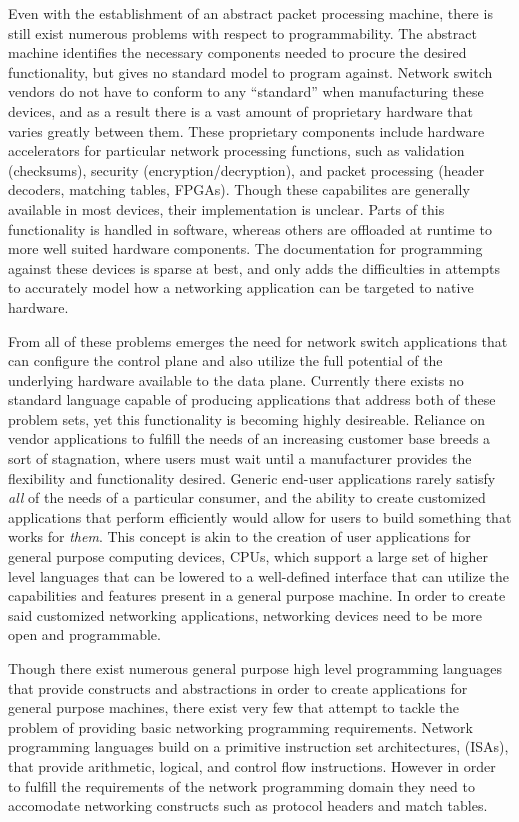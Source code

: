 Even with the establishment of an abstract packet processing machine, there
is still exist numerous problems with respect to programmability. The abstract 
machine identifies the necessary components needed to procure the desired 
functionality, but gives no standard model to program against. Network switch
vendors do not have to conform to any ``standard'' when manufacturing these
devices, and as a result there is a vast amount of proprietary hardware that
varies greatly between them. These proprietary components include hardware 
accelerators for particular network processing functions, such as validation 
(checksums), security (encryption/decryption), and packet processing (header
decoders, matching tables, FPGAs). Though these capabilites are generally 
available in most devices, their implementation is unclear. Parts of this 
functionality is handled in software, whereas others are offloaded at runtime 
to more well suited hardware components. The documentation for programming 
against these devices is sparse at best, and only adds the difficulties in 
attempts to accurately model how a networking application can be targeted to 
native hardware.

From all of these problems emerges the need for network switch applications
that can configure the control plane and also utilize the full potential of 
the underlying hardware available to the data plane. Currently there exists
no standard language capable of producing applications that address both of
these problem sets, yet this functionality is becoming highly desireable.
Reliance on vendor applications to fulfill the needs of an increasing customer
base breeds a sort of stagnation, where users must wait until a manufacturer
provides the flexibility and functionality desired. Generic end-user
applications rarely satisfy \emph{all} of the needs of a particular consumer, 
and the ability to create customized applications that perform efficiently 
would allow for users to build something that works for \emph{them}. This 
concept is akin to the creation of user applications for general purpose 
computing devices, CPUs, which support a large set of higher level languages 
that can be lowered to a well-defined interface that can utilize the 
capabilities and features present in a general purpose machine. In order to
create said customized networking applications, networking devices need to be
more open and programmable.

Though there exist numerous general purpose high level programming languages
that provide constructs and abstractions in order to create applications for
general purpose machines, there exist very few that attempt to tackle the
problem of providing basic networking programming requirements. Network
programming languages build on a primitive instruction set architectures,
(ISAs), that provide arithmetic, logical, and control flow instructions.
However in order to fulfill the requirements of the network programming domain
they need to accomodate networking constructs such as protocol headers and 
match tables. 

